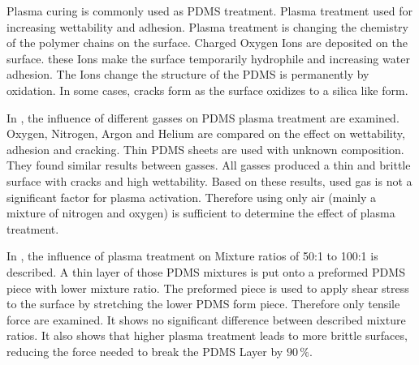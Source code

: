 Plasma curing is commonly used as PDMS treatment. Plasma treatment used for increasing wettability and adhesion. Plasma treatment is changing the chemistry of the polymer chains on the surface. Charged Oxygen Ions are deposited on the surface. these Ions make the surface temporarily hydrophile and increasing water adhesion. The Ions change the structure of the PDMS is permanently by oxidation. In some cases, cracks form as the surface oxidizes to a silica like form.

In \cite{Owen.1994}, the influence of different gasses on PDMS plasma treatment are examined. Oxygen, Nitrogen, Argon and Helium are compared on the effect on wettability, adhesion and cracking. Thin PDMS sheets are used with unknown composition. They found similar results between gasses. All gasses produced a thin and brittle surface with cracks and high wettability. Based on these results, used gas is not a significant factor for plasma activation. Therefore using only air (mainly a mixture of nitrogen and oxygen) is sufficient to determine the effect of plasma treatment.

In \cite{Ohishi.2017}, the influence of plasma treatment on Mixture ratios of 50:1 to 100:1 is described. A thin layer of those PDMS mixtures is put onto a preformed PDMS piece with lower mixture ratio. The preformed piece is used to apply shear stress to the surface by stretching the lower PDMS form piece. Therefore only tensile force are examined. It shows no significant difference between described mixture ratios. It also shows that higher plasma treatment leads to more brittle surfaces, reducing the force needed to break the PDMS Layer by $90\,\%$.



